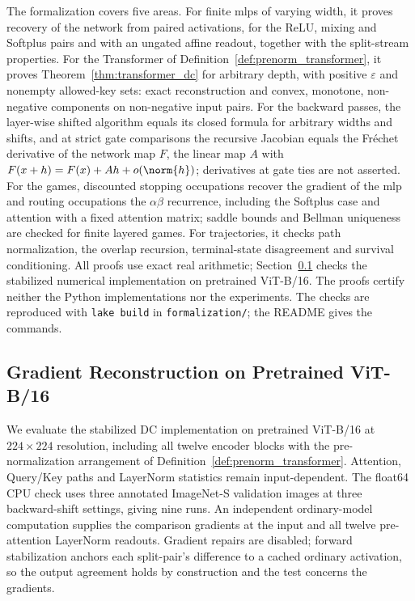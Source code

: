 

The formalization covers five areas. For finite \acp{mlp} of varying width, it proves recovery of the network from paired activations, for the ReLU, mixing and Softplus pairs and with an ungated affine readout, together with the split-stream properties. For the Transformer of Definition~\ref{def:prenorm_transformer}, it proves Theorem~\ref{thm:transformer_dc} for arbitrary depth, with positive $\varepsilon$ and nonempty allowed-key sets: exact reconstruction and convex, monotone, non-negative components on non-negative input pairs. For the backward passes, the layer-wise shifted algorithm equals its closed formula for arbitrary widths and shifts, and at strict gate comparisons the recursive Jacobian equals the Fr\'echet derivative of the network map $F$, the linear map $A$ with $F(x+h)=F(x)+Ah+o(\norm{h})$; derivatives at gate ties are not asserted. For the games, discounted stopping occupations recover the gradient of the \ac{mlp} and routing occupations the $\alpha\beta$ recurrence, including the Softplus case and attention with a fixed attention matrix; saddle bounds and Bellman uniqueness are checked for finite layered games. For trajectories, it checks path normalization, the overlap recursion, terminal-state disagreement and survival conditioning. All proofs use exact real arithmetic; Section~\ref{app:transformer_dc_numeric} checks the stabilized numerical implementation on pretrained ViT-B/16. The proofs certify neither the Python implementations nor the experiments. The checks are reproduced with \texttt{lake build} in \texttt{formalization/}; the README gives the commands.

\subsection{Gradient Reconstruction on Pretrained ViT-B/16}\label{app:transformer_dc_numeric}

We evaluate the stabilized DC implementation on pretrained ViT-B/16 at $224\times224$ resolution, including all twelve encoder blocks with the pre-normalization arrangement of Definition~\ref{def:prenorm_transformer}. Attention, Query/Key paths and LayerNorm statistics remain input-dependent. The float64 CPU check uses three annotated ImageNet-S validation images at three backward-shift settings, giving nine runs. An independent ordinary-model computation supplies the comparison gradients at the input and all twelve pre-attention LayerNorm readouts. Gradient repairs are disabled; forward stabilization anchors each split-pair's difference to a cached ordinary activation, so the output agreement holds by construction and the test concerns the gradients.

